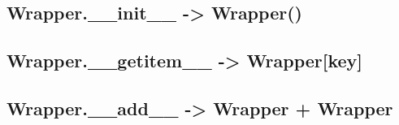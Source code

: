 \subsection{Wrapper.\_\_init\_\_ -> Wrapper()} \label{subsec:wrapper.__init__}
    

\subsection{Wrapper.\_\_getitem\_\_ -> Wrapper[key]} \label{subsec:wrapper.__getitem__}
    

\subsection{Wrapper.\_\_add\_\_ -> Wrapper + Wrapper} \label{subsec:wrapper.__add__}
    